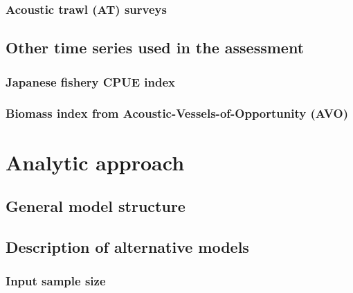 \documentclass[11pt,]{article}
\begin{document}
\hypertarget{acoustic-trawl-at-surveys}{%
\subsubsection{Acoustic trawl (AT)
surveys}\label{acoustic-trawl-at-surveys}}

\hypertarget{other-time-series-used-in-the-assessment}{%
\subsection{Other time series used in the
assessment}\label{other-time-series-used-in-the-assessment}}

\hypertarget{japanese-fishery-cpue-index}{%
\subsubsection{Japanese fishery CPUE
index}\label{japanese-fishery-cpue-index}}

\hypertarget{biomass-index-from-acoustic-vessels-of-opportunity-avo}{%
\subsubsection{Biomass index from Acoustic-Vessels-of-Opportunity
(AVO)}\label{biomass-index-from-acoustic-vessels-of-opportunity-avo}}

\hypertarget{analytic-approach}{%
\section{Analytic approach}\label{analytic-approach}}

\hypertarget{general-model-structure}{%
\subsection{General model structure}\label{general-model-structure}}

\hypertarget{description-of-alternative-models}{%
\subsection{Description of alternative
models}\label{description-of-alternative-models}}

\hypertarget{input-sample-size}{%
\subsubsection{Input sample size}\label{input-sample-size}}
\end{document}
